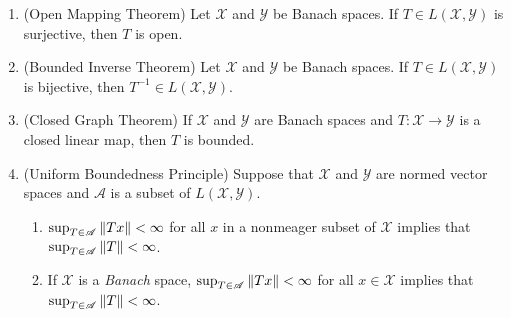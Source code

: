 \documentclass{article}
\begin{document}
\begin{enumerate}[resume = real_analysis]
\begin{solutions}
			($\Longleftarrow$)  Let $\mathscr{X}$ be a normed vector space and $\mathscr{M} \subseteq \mathscr{X}$ a subspace. One notes that the closure $\overline{\mathscr{M}}$ is a closed subspace of $\mathscr{X}$. So assume $\overline{\mathscr{M}} \neq \mathscr{X}$; i.e., assume there exists some $x_{0} \in \mathscr{X}\setminus \overline{\mathscr{M}}$. Then by the Hahn-Banach Theorem, there exists a continuous linear functional $f \in \mathscr{X}^{\ast}$ such that $f(x_{0}) \neq 0$ and $f|_{\mathscr{M}} = 0$. Therefore, by the contrapositive, it follows that if every $f \in \mathscr{X}^{\ast}$ satisfying $f|_{\mathscr{M}} = 0$ is the zero functional, then $\mathscr{M}$ is dense in $\mathscr{X}$.
			
			($\Longrightarrow$) Now assume $\overline{\mathscr{M}} = \mathscr{X}$, and let $f \in \mathscr{X}^{\ast}$ be a \textit{continuous} linear functional satisfying $f|_{\mathscr{M}} =0$. Let $x \in \overline{\mathscr{M}}$. since $\mathscr{M}$ is a normed linear subspace (hence a metrizable space), there exists a sequence $\{x_{n}\} \subset \mathscr{M}$ such that $x_{n} \to x$. By continuity of $f$, $0 = f(x_{n}) \to f(x)$ so that $f(x) = 0$. Thus $f \equiv 0$ on $\overline{\mathscr{M}} = \mathscr{X}$.
		\end{solutions}
		\item (Open Mapping Theorem) Let $\mathscr{X}$ and $\mathscr{Y}$ be Banach spaces. If $T \in L(\mathscr{X}, \mathscr{Y})$ is surjective, then $T$ is open. 
		\item (Bounded Inverse Theorem) Let $\mathscr{X}$ and $\mathscr{Y}$ be Banach spaces. If $T \in L(\mathscr{X}, \mathscr{Y})$ is bijective, then $T^{-1} \in L(\mathscr{X}, \mathscr{Y})$. 
		\item (Closed Graph Theorem) If $\mathscr{X}$ and $\mathscr{Y}$ are Banach spaces and $T: \mathscr{X} \to\mathscr{Y}$ is a closed linear map, then $T$ is bounded. 
		\item (Uniform Boundedness Principle) Suppose that $\mathscr{X}$ and $\mathscr{Y}$ are normed vector spaces and $\mathscr{A}$ is a subset of $L(\mathscr{X}, \mathscr{Y})$. \vspace{-0.25cm}
		\begin{enumerate}[itemsep =-2pt,label = (\alph{*})]
			\item $\sup_{T \in \mathscr{A}}\left\Vert Tx \right\Vert < \infty$ for all $x$ in a nonmeager subset of $\mathscr{X}$ implies that $\sup_{T\in \mathscr{A}}\left\Vert T \right\Vert < \infty$. 
			\item If $\mathscr{X}$ is a \textit{Banach} space, $\sup_{T \in \mathscr{A}}\left\Vert Tx \right\Vert < \infty$ for all $x\in\mathscr{X}$ implies that $\sup_{T\in \mathscr{A}}\left\Vert T \right\Vert < \infty$. 
		\end{enumerate}
	\end{enumerate}
	
\end{document}

